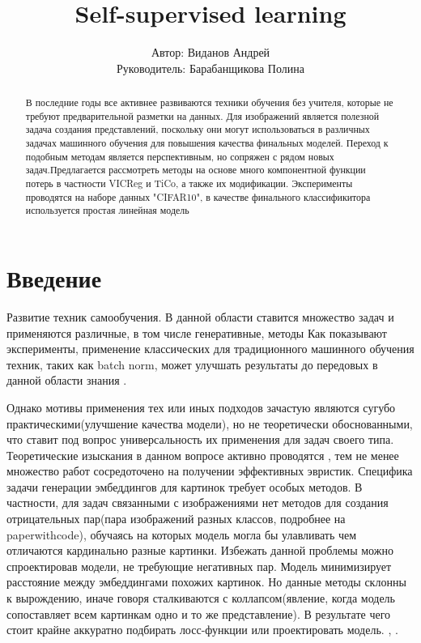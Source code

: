 \documentclass{article}
\title{Self-supervised learning}
\author{Автор: Виданов Андрей \\Руководитель: Барабанщикова Полина}
\begin{document}
\maketitle
\begin{abstract}
В последние годы все активнее развиваются техники обучения без учителя, которые не требуют предварительной разметки на данных. Для изображений является полезной задача создания представлений, поскольку они могут использоваться в различных задачах машинного обучения для повышения качества финальных моделей. Переход к подобным методам является перспективным, но сопряжен с рядом новых задач.Предлагается рассмотреть методы на основе много компонентной функции потерь в частности VICReg и TiCo, а также их модификации. Эксперименты проводятся на наборе данных "CIFAR10", в качестве финального классификитора используется простая линейная модель
\end{abstract}

\section{Введение}
Развитие техник самообучения\cite{https://habr.com/ru/post/704710/}. В данной области ставится множество задач и применяются различные, в том числе генеративные, методы \cite{https://arxiv.org/pdf/2006.08218.pdf}
Как показывают эксперименты, применение классических для традиционного машинного обучения техник, таких как batch norm, может улучшать результаты до передовых в данной области знания \cite{https://generallyintelligent.com/blog/2020-08-24-understanding-self-supervised-contrastive-learning}.

Однако мотивы применения тех или иных подходов зачастую являются сугубо практическими(улучшение качества модели), но не теоретически обоснованными, что ставит под вопрос универсальность их применения для задач своего типа. Теоретические изыскания в данном вопросе активно проводятся \cite{https://arxiv.org/pdf/2105.04906.pdf}, тем не менее множество работ сосредоточено на получении эффективных эвристик. Специфика задачи генерации эмбеддингов для картинок требует особых методов.
В частности, для задач связанными с изображениями нет методов для создания отрицательных пар(пара изображений разных классов, подробнее на paperwithcode\cite{https://paperswithcode.com/paper/solving-inefficiency-of-self-supervised}), обучаясь на которых модель могла бы улавливать чем отличаются кардинально разные картинки. Избежать данной проблемы можно спроектировав модели, не требующие негативных пар. Модель минимизирует расстояние между эмбеддингами похожих картинок. Но данные методы склонны к вырождению, иначе говоря сталкиваются с коллапсом(явление, когда модель сопоставляет всем картинкам одно и то же представление). В результате чего стоит крайне аккуратно подбирать лосс-функции\cite{https://arxiv.org/pdf/2105.04906.pdf} или проектировать модель. \cite{https://arxiv.org/pdf/2011.10566.pdf}, \cite{https://arxiv.org/pdf/2103.03230.pdf}. 
\end{document}
